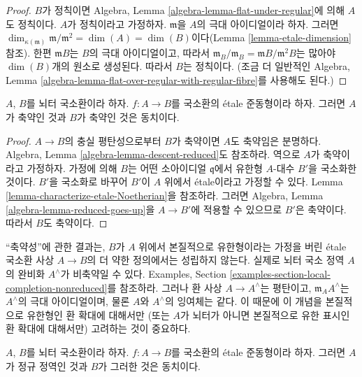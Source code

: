 \begin{proof}
$B$가 정칙이면 Algebra, Lemma
\ref{algebra-lemma-flat-under-regular}에 의해 $A$도 정칙이다.
$A$가 정칙이라고 가정하자. $\mathfrak m$을 $A$의 극대 아이디얼이라 하자.
그러면 $\dim_{\kappa(\mathfrak m)} \mathfrak m/\mathfrak m^2 =
\dim(A) = \dim(B)$이다(Lemma \ref{lemma-etale-dimension} 참조).
한편 $\mathfrak mB$는 $B$의 극대 아이디얼이고,
따라서 $\mathfrak m_B/\mathfrak m_B = \mathfrak mB/\mathfrak m^2B$는
많아야 $\dim(B)$개의 원소로 생성된다. 따라서 $B$는 정칙이다.
(조금 더 일반적인 Algebra, Lemma
\ref{algebra-lemma-flat-over-regular-with-regular-fibre}를 사용해도 된다.)
\end{proof}


\begin{proposition}
\label{proposition-etale-reduced}
$A$, $B$를 뇌터 국소환이라 하자.
$f : A \to B$를 국소환의 \'etale 준동형이라 하자.
그러면 $A$가 축약인 것과 $B$가 축약인 것은 동치이다.
\end{proposition}

\begin{proof}
$A \to B$의 충실 평탄성으로부터 $B$가 축약이면 $A$도 축약임은 분명하다.
Algebra, Lemma \ref{algebra-lemma-descent-reduced}도 참조하라.
역으로 $A$가 축약이라고 가정하자. 가정에 의해 $B$는 어떤 소아이디얼
$\mathfrak q$에서 유한형 $A$-대수 $B'$을 국소화한 것이다.
$B'$을 국소화로 바꾸어 $B'$이 $A$ 위에서 \'etale이라고 가정할 수 있다.
Lemma \ref{lemma-characterize-etale-Noetherian}을 참조하라.
그러면 Algebra, Lemma \ref{algebra-lemma-reduced-goes-up}을
$A \to B'$에 적용할 수 있으므로 $B'$은 축약이다. 따라서 $B$도 축약이다.
\end{proof}

\begin{remark}
\label{remark-technicality-needed}
“축약성”에 관한 결과는, $B$가 $A$ 위에서 본질적으로 유한형이라는
가정을 버린 \'etale 국소환 사상 $A \to B$의 더 약한 정의에서는 성립하지 않는다.
실제로 뇌터 국소 정역 $A$의 완비화 $A^\wedge$가 비축약일 수 있다.
Examples, Section \ref{examples-section-local-completion-nonreduced}를 참조하라.
그러나 환 사상 $A \to A^\wedge$는 평탄이고,
$\mathfrak m_AA^\wedge$는 $A^\wedge$의 극대 아이디얼이며,
물론 $A$와 $A^\wedge$의 잉여체는 같다.
이 때문에 이 개념을 본질적으로 유한형인 환 확대에 대해서만
(또는 $A$가 뇌터가 아니면 본질적으로 유한 표시인 환 확대에 대해서만)
고려하는 것이 중요하다.
\end{remark}

\begin{proposition}
\label{proposition-etale-normal}
\begin{reference}
\cite[Expose I, Theorem 9.5 part (i)]{SGA1}
\end{reference}
$A$, $B$를 뇌터 국소환이라 하자.
$f : A \to B$를 국소환의 \'etale 준동형이라 하자.
그러면 $A$가 정규 정역인 것과 $B$가 그러한 것은 동치이다.
\end{proposition}

